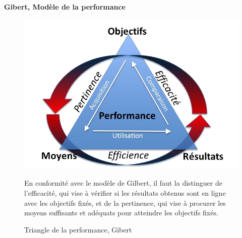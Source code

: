         \paragraph{Gibert, Modèle de la performance}
        \strut%
        \begin{figure}[!h]
                \begin{minipage}{0.435\linewidth}
                \centering
                    \includegraphics[width=\linewidth]{Figures/Gibert-Modele_performance.png}
                    \caption{Triangle de la performance, Gibert~}
                    \label{fig:perf_gibert}
                \end{minipage}
                \hfill
                \begin{minipage}{0.55\linewidth}
                \myDefautStyle
                    En conformité avec le modèle de Gilbert, il faut la distinguer de l'efficacité, qui vise à vérifier si les résultats obtenus sont en ligne avec les objectifs fixés, et de la pertinence, qui vise à procurer les moyens suffisants et adéquats pour atteindre les objectifs fixés.\par\vspace{1cm}
                \end{minipage}
        \end{figure}{}\par%
